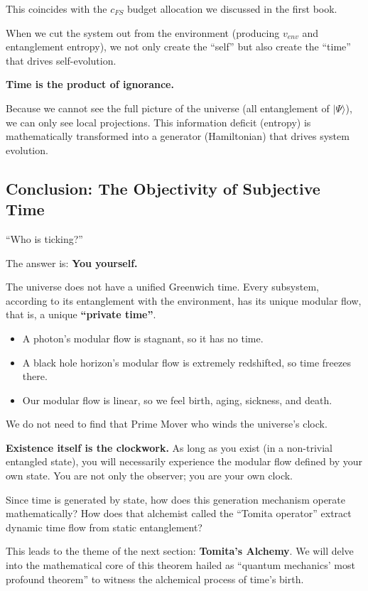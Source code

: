 This coincides with the $c_{FS}$ budget allocation we discussed in the first book.

When we cut the system out from the environment (producing $v_{env}$ and entanglement entropy), we not only create the ``self'' but also create the ``time'' that drives self-evolution.

\textbf{Time is the product of ignorance.}

Because we cannot see the full picture of the universe (all entanglement of $|\Psi\rangle$), we can only see local projections. This information deficit (entropy) is mathematically transformed into a generator (Hamiltonian) that drives system evolution.

\subsection{Conclusion: The Objectivity of Subjective Time}

``Who is ticking?''

The answer is: \textbf{You yourself.}

The universe does not have a unified Greenwich time. Every subsystem, according to its entanglement with the environment, has its unique modular flow, that is, a unique \textbf{``private time''}.

\begin{itemize}
\item A photon's modular flow is stagnant, so it has no time.

\item A black hole horizon's modular flow is extremely redshifted, so time freezes there.

\item Our modular flow is linear, so we feel birth, aging, sickness, and death.
\end{itemize}

We do not need to find that Prime Mover who winds the universe's clock.

\textbf{Existence itself is the clockwork.} As long as you exist (in a non-trivial entangled state), you will necessarily experience the modular flow defined by your own state. You are not only the observer; you are your own clock.

Since time is generated by state, how does this generation mechanism operate mathematically? How does that alchemist called the ``Tomita operator'' extract dynamic time flow from static entanglement?

This leads to the theme of the next section: \textbf{Tomita's Alchemy}. We will delve into the mathematical core of this theorem hailed as ``quantum mechanics' most profound theorem'' to witness the alchemical process of time's birth.


